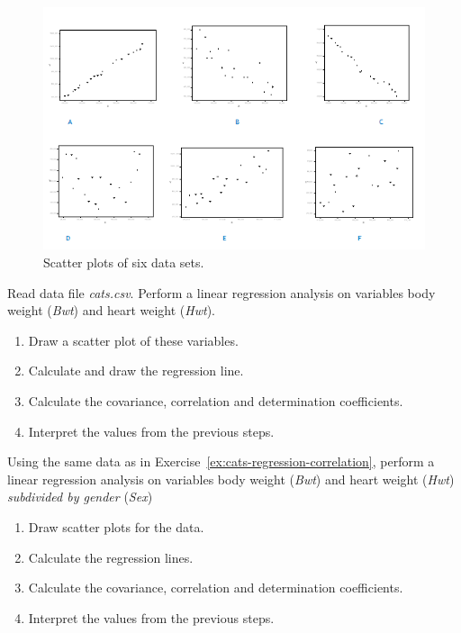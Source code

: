 \begin{figure}
  \centering
  \includegraphics[width=\textwidth]{images/correlaties.png}
  \caption{Scatter plots of six data sets.}
\label{fig:correlations}
\end{figure}

\begin{exercise}
  \label{ex:cats-regression-correlation}
  Read data file \emph{cats.csv}. Perform a linear regression analysis on variables body weight (\emph{Bwt}) and heart weight (\emph{Hwt}).
  
  \begin{enumerate}
  \item Draw a scatter plot of these variables.
  \item Calculate and draw the regression line.
  \item Calculate the covariance, correlation and determination coefficients.
  \item Interpret the values from the previous steps.
  \end{enumerate}
\end{exercise}

\begin{exercise}
  Using the same data as in Exercise~\ref{ex:cats-regression-correlation}, perform a linear regression analysis on variables body weight (\emph{Bwt}) and heart weight (\emph{Hwt}) \emph{subdivided by gender} (\emph{Sex})
  
  \begin{enumerate}
  \item Draw scatter plots for the data.
  \item Calculate the regression lines.
  \item Calculate the covariance, correlation and determination coefficients.
  \item Interpret the values from the previous steps.
  \end{enumerate}
\end{exercise}

